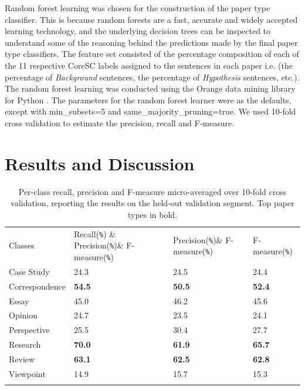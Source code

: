 \documentclass{svmult}
\begin{document}
Random forest learning\cite{Breiman2001} was chosen for the construction of the
paper type classifier. This is because random forests are a fast, accurate and
widely accepted learning technology, and the underlying decision trees can be
inspected to understand some of the reasoning behind the predictions made by
the final paper type classifiers. The feature set consisted of the percentage
composition of each of the 11 respective CoreSC labels assigned to the
sentences in each paper i.e. (the percentage of {\em Background} sentences, the
percentage of {\em Hypothesis} sentences, etc.). The random forest learning was
conducted using the Orange data mining library for Python \cite{Curk2005}.  The
parameters for the random forest learner were as the defaults, except with
min\_subsets=5 and same\_majority\_pruning=true.  We used 10-fold cross
validation to estimate the precision, recall and F-measure.


\vspace{-15pt}
\section{Results and Discussion}
\label{sec:3}



\begin{table}

\caption{Per-class recall, precision and F-measure micro-averaged over 10-fold cross validation, reporting the results on the held-out validation segment. Top paper types in bold.}

\begin{tabular}{p{2.4cm}p{2.0cm}p{2.0cm}p{2.5cm}}
\hline\noalign{\smallskip}
Classes & Recall(\verb|%|) & Precision(\verb|%|)& F-measure(\verb|%|) \\
\noalign{\smallskip}\svhline\noalign{\smallskip}
Case Study      &   24.3    &    24.5     &   24.4 \\
Correspondence  &   {\bf  54.5}    &    {\bf 50.5}    &    {\bf 52.4} \\ 
Essay           &   45.0     &   46.2    &    45.6 \\
Opinion         &   24.7    &    23.5  &      24.1 \\   
Perspective     &   25.5  &      30.4  &       27.7 \\
Research        &   {\bf 70.0}    &    {\bf 61.9}    &    {\bf 65.7} \\
Review          &  {\bf 63.1}     &   {\bf 62.5}     &   {\bf 62.8} \\
Viewpoint       &     14.9     &   15.7  &      15.3 \\
\noalign{\smallskip}\hline\noalign{\smallskip}
\end{tabular}


\vspace{-20pt}
\label{tab:recallPrecision}       %
\end{table}
\end{document}
